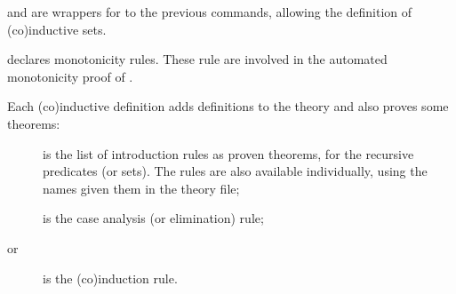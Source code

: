 \begin{isabellebody}
\begin{isamarkuptext}
\begin{descr}
  \item [\hyperlink{command.HOL.inductive-set}{\mbox{\isa{\isacommand{inductive{\isacharunderscore}set}}}} and \hyperlink{command.HOL.coinductive-set}{\mbox{\isa{\isacommand{coinductive{\isacharunderscore}set}}}}] are wrappers for to the previous commands,
  allowing the definition of (co)inductive sets.

  \item [\hyperlink{attribute.HOL.mono}{\mbox{\isa{mono}}}] declares monotonicity rules.  These
  rule are involved in the automated monotonicity proof of \hyperlink{command.HOL.inductive}{\mbox{}}.

  \end{descr}%
\end{isamarkuptext}%
\isamarkuptrue%
%
\isamarkuptrue%
%
\begin{isamarkuptext}%
Each (co)inductive definition  adds definitions to the
  theory and also proves some theorems:

  \begin{description}

  \item [] is the list of introduction rules as proven
  theorems, for the recursive predicates (or sets).  The rules are
  also available individually, using the names given them in the
  theory file;

  \item [] is the case analysis (or elimination) rule;

  \item [ or ] is the (co)induction
  rule.

  \end{description}


\end{isamarkuptext}
\end{isabellebody}
